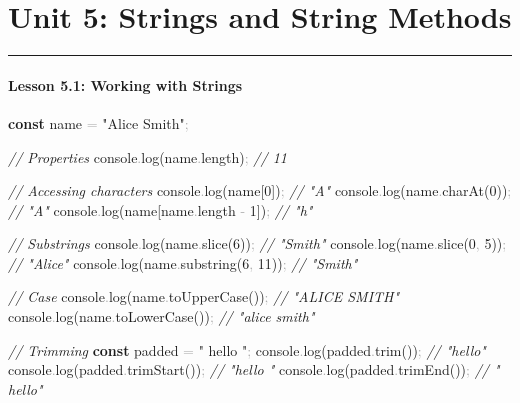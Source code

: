 \documentclass[
  justified,
  openright,
]{tufte-book}
\let\subsection\paragraph
\let\paragraph\paragraph
\newcommand{\KeywordTok}[1]{\textcolor{CodeKeyword}{\textbf{#1}}}  %
\newcommand{\StringTok}[1]{\textcolor{CodeString}{#1}}              %
\newcommand{\CommentTok}[1]{\textcolor{CodeComment}{\textit{#1}}}  %
\newcommand{\CodeNumTok}[1]{\textcolor{CodeNumber}{#1}}             %
\newcommand{\CodeFuncTok}[1]{\textcolor{CodeKeyword}{#1}}           %
\newcommand{\CodeTypeTok}[1]{\textcolor{CodeType}{#1}}              %
\newcommand{\OperatorTok}[1]{\textcolor{DarkGray}{#1}}              %
\newenvironment{Shaded}{%
  \begin{mdframed}[style=TufteCode]%
}{%
  \end{mdframed}%
}
\let\subsection\paragraph
\let\paragraph\paragraph
\begin{document}
\newpage

\section{Unit 5: Strings and String
Methods}\label{unit-5-strings-and-string-methods}

\begin{center}\rule{0.5\linewidth}{0.5pt}\end{center}

\subsection{Lesson 5.1: Working with
Strings}\label{lesson-5.1-working-with-strings}

\begin{Shaded}
\begin{Highlighting}[]
\KeywordTok{const} name \OperatorTok{=} \StringTok{"Alice Smith"}\OperatorTok{;}
 
\CommentTok{// Properties}
console\OperatorTok{.}\CodeFuncTok{log}(name\OperatorTok{.}\CodeTypeTok{length})\OperatorTok{;} \CommentTok{// 11}
 
\CommentTok{// Accessing characters}
console\OperatorTok{.}\CodeFuncTok{log}(name[\CodeNumTok{0}])\OperatorTok{;} \CommentTok{// "A"}
console\OperatorTok{.}\CodeFuncTok{log}(name\OperatorTok{.}\CodeFuncTok{charAt}(\CodeNumTok{0}))\OperatorTok{;} \CommentTok{// "A"}
console\OperatorTok{.}\CodeFuncTok{log}(name[name\OperatorTok{.}\CodeTypeTok{length} \OperatorTok{{-}} \CodeNumTok{1}])\OperatorTok{;} \CommentTok{// "h"}
 
\CommentTok{// Substrings}
console\OperatorTok{.}\CodeFuncTok{log}(name\OperatorTok{.}\CodeFuncTok{slice}(\CodeNumTok{6}))\OperatorTok{;} \CommentTok{// "Smith"}
console\OperatorTok{.}\CodeFuncTok{log}(name\OperatorTok{.}\CodeFuncTok{slice}(\CodeNumTok{0}\OperatorTok{,} \CodeNumTok{5}))\OperatorTok{;} \CommentTok{// "Alice"}
console\OperatorTok{.}\CodeFuncTok{log}(name\OperatorTok{.}\CodeFuncTok{substring}(\CodeNumTok{6}\OperatorTok{,} \CodeNumTok{11}))\OperatorTok{;} \CommentTok{// "Smith"}
 
\CommentTok{// Case}
console\OperatorTok{.}\CodeFuncTok{log}(name\OperatorTok{.}\CodeFuncTok{toUpperCase}())\OperatorTok{;} \CommentTok{// "ALICE SMITH"}
console\OperatorTok{.}\CodeFuncTok{log}(name\OperatorTok{.}\CodeFuncTok{toLowerCase}())\OperatorTok{;} \CommentTok{// "alice smith"}
 
\CommentTok{// Trimming}
\KeywordTok{const} padded \OperatorTok{=} \StringTok{"  hello  "}\OperatorTok{;}
console\OperatorTok{.}\CodeFuncTok{log}(padded\OperatorTok{.}\CodeFuncTok{trim}())\OperatorTok{;} \CommentTok{// "hello"}
console\OperatorTok{.}\CodeFuncTok{log}(padded\OperatorTok{.}\CodeFuncTok{trimStart}())\OperatorTok{;} \CommentTok{// "hello  "}
console\OperatorTok{.}\CodeFuncTok{log}(padded\OperatorTok{.}\CodeFuncTok{trimEnd}())\OperatorTok{;} \CommentTok{// "  hello"}
 

\end{Highlighting}
\end{Shaded}
\end{document}
